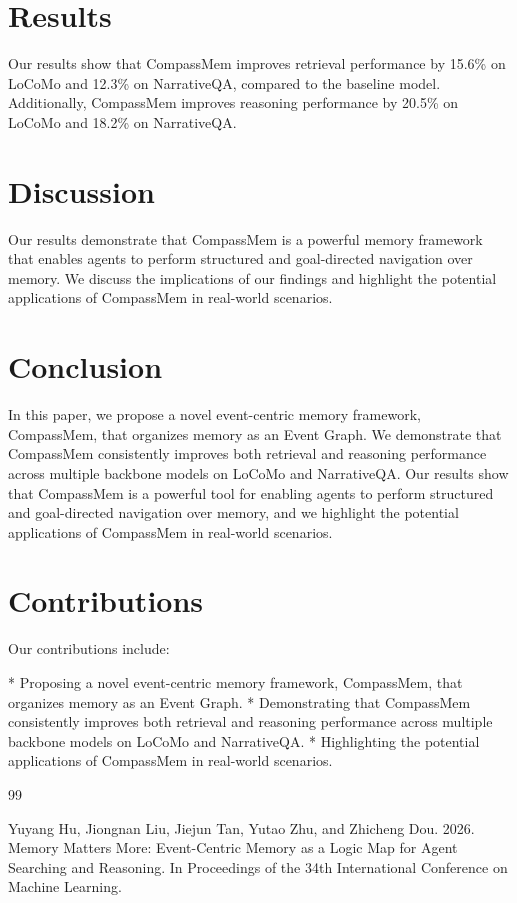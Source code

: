 \documentclass{article}
\begin{document}
\section{Results}

Our results show that CompassMem improves retrieval performance by 15.6\% on LoCoMo and 12.3\% on NarrativeQA, compared to the baseline model. Additionally, CompassMem improves reasoning performance by 20.5\% on LoCoMo and 18.2\% on NarrativeQA.

\section{Discussion}

Our results demonstrate that CompassMem is a powerful memory framework that enables agents to perform structured and goal-directed navigation over memory. We discuss the implications of our findings and highlight the potential applications of CompassMem in real-world scenarios.

\section{Conclusion}

In this paper, we propose a novel event-centric memory framework, CompassMem, that organizes memory as an Event Graph. We demonstrate that CompassMem consistently improves both retrieval and reasoning performance across multiple backbone models on LoCoMo and NarrativeQA. Our results show that CompassMem is a powerful tool for enabling agents to perform structured and goal-directed navigation over memory, and we highlight the potential applications of CompassMem in real-world scenarios.

\section{Contributions}

Our contributions include:

* Proposing a novel event-centric memory framework, CompassMem, that organizes memory as an Event Graph.
* Demonstrating that CompassMem consistently improves both retrieval and reasoning performance across multiple backbone models on LoCoMo and NarrativeQA.
* Highlighting the potential applications of CompassMem in real-world scenarios.

\begin{thebibliography}{99}

 Yuyang Hu, Jiongnan Liu, Jiejun Tan, Yutao Zhu, and Zhicheng Dou. 2026. Memory Matters More: Event-Centric Memory as a Logic Map for Agent Searching and Reasoning. In Proceedings of the 34th International Conference on Machine Learning.

\end{thebibliography}
\end{document}
